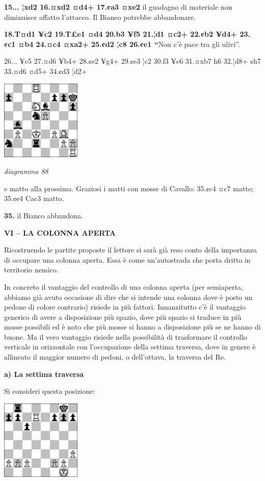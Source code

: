 \documentclass[
]{article}
\begin{document}
\textbf{15... ¦xd2 16.¤xd2 ¤d4+ 17.¢a3 ¤xe2} il guadagno di materiale
non diminuisce affatto l'attacco. Il Bianco potrebbe abbandonare.

\textbf{18.T¤d1 ¥c2 19.T£e1 ¤d4 20.b3 ¥f5 21.¦d1 ¤c2+ 22.¢b2 ¥d4+ 23.¢c1
¤b4 24.¤c4 ¤xa2+ 25.¢d2 ¦c8 26.¢e1 ``}Non c'è pace tra gli ulivi''.

26... ¥c5 27.¤d6 ¥b4+ 28.¢e2 ¥g4+ 29.¢e3 ¦c2 30.f3 ¥e6 31.¤xb7 h6
32.¦d8+ ¢h7 33.¤d6 ¤d5+ 34.¢d3 ¦d2+

\includegraphics[width=1.5in,height=1.5in]{vertopal_109f12be458a423d8f3cc838880eaea2/media/image88.png}

\emph{diagramma 88}

e matto alla prossima. Graziosi i matti con mosse di Cavallo: 35.¢c4 ¤c7
matto; 35.¢e4 Cac3 matto.

\textbf{35.} il Bianco abbandona.

\textbf{VI -- LA COLONNA APERTA}

Ricostruendo le partite proposte il lettore si sarà già reso conto della
importanza di occupare una colonna aperta. Essa è come un'autostrada che
porta dritto in territorio nemico.

In concreto il vantaggio del controllo di una colonna aperta (per
semiaperta, abbiamo già avuto occasione di dire che si intende una
colonna dove è posto un pedone di colore contrario) risiede in più
fattori. Innanzitutto c'è il vantaggio generico di avere a disposizione
più spazio, dove più spazio si traduce in più mosse possibili ed è noto
che più mosse si hanno a disposizione più se ne hanno di buone. Ma il
vero vantaggio risiede nella possibilità di trasformare il controllo
verticale in orizzontale con l'occupazione della settima traversa, dove
in genere è allineato il maggior numero di pedoni, o dell'ottava, la
traversa del Re.

\textbf{a) La settima traversa}

Si consideri questa posizione:

\includegraphics[width=1.5in,height=1.5in]{vertopal_109f12be458a423d8f3cc838880eaea2/media/image89.png}
\end{document}
